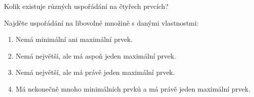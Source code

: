 \documentclass[10pt]{article}
\begin{document}
\begin{problem}
Kolik existuje různých uspořádání na čtyřech prvcích?
\end{problem}

\begin{problem}
Najděte uspořádání na libovolné množině s danými vlastnostmi:
\begin{enumerate}[label=(\alph*)]
    \item Nemá minimální ani maximální prvek.
    \item Nemá největší, ale má aspoň jeden maximální prvek.
    \item Nemá největší, ale má právě jeden maximální prvek.
    \item Má nekonečně mnoho minimálních prvků a má právě jeden maximální prvek.
\end{enumerate}
\end{problem}
\end{document}
